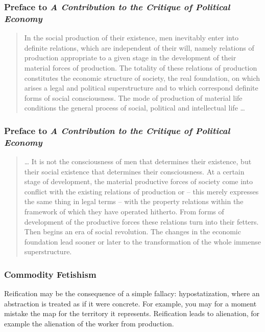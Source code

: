 \documentclass[xcolor=dvipsnames]{beamer}
\begin{document}
\begin{frame}
  \frametitle{Preface to \emph{A Contribution to the Critique of
        Political Economy}}
  \begin{quote}
    In the social production of their existence, men inevitably enter
    into definite relations, which are independent of their will,
    namely relations of production appropriate to a given stage in the
    development of their material forces of production. The totality
    of these relations of production constitutes the economic
    structure of society, the real foundation, on which arises a legal
    and political superstructure and to which correspond definite
    forms of social consciousness. The mode of production of material
    life conditions the general process of social, political and
    intellectual life {\ldots}
  \end{quote}
\end{frame}

\begin{frame}
  \frametitle{Preface to \emph{A Contribution to the Critique of
        Political Economy}}
  \begin{quote}
    {\ldots} It is not the consciousness of men that determines their
    existence, but their social existence that determines their
    consciousness. At a certain stage of development, the material
    productive forces of society come into conflict with the existing
    relations of production or – this merely expresses the same thing
    in legal terms – with the property relations within the framework
    of which they have operated hitherto. From forms of development of
    the productive forces these relations turn into their fetters.
    Then begins an era of social revolution. The changes in the
    economic foundation lead sooner or later to the transformation of
    the whole immense superstructure.
  \end{quote}
\end{frame}

\begin{frame}
  \frametitle{Commodity Fetishism}
  Reification may be the consequence of a simple fallacy:
  \alert{hypostatization}, where an abstraction is treated as if it
  were concrete. For example, you may for a moment mistake the map for
  the territory it represents. Reification leads to
  \alert{alienation}, for example the alienation of the worker from
  production.
\end{frame}
\end{document}
